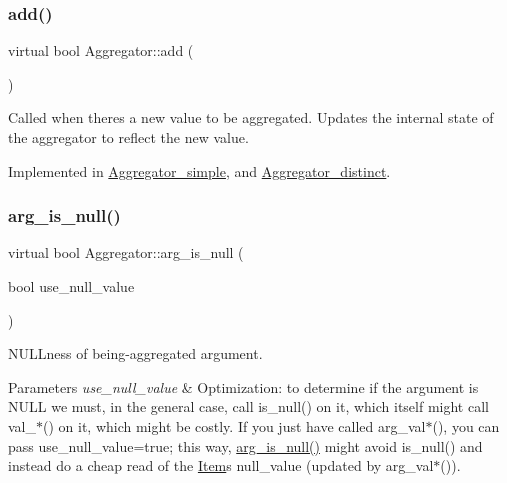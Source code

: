 \subsubsection{\texorpdfstring{add()}{add()}}
{\footnotesize\ttfamily virtual bool Aggregator\+::add (\begin{DoxyParamCaption}{ }\end{DoxyParamCaption})\hspace{0.3cm}{\ttfamily [pure virtual]}}

Called when there\textquotesingle{}s a new value to be aggregated. Updates the internal state of the aggregator to reflect the new value. 

Implemented in \mbox{\hyperlink{classAggregator__simple_aa3b0160d86a60634bd390596bd524c7a}{Aggregator\+\_\+simple}}, and \mbox{\hyperlink{classAggregator__distinct_af72d7cc1082245015c41e99893992a4f}{Aggregator\+\_\+distinct}}.

\mbox{\label{classAggregator_a2581c04dee61cf1a4d72519da64baf53}} 
\subsubsection{\texorpdfstring{arg\+\_\+is\+\_\+null()}{arg\_is\_null()}}
{\footnotesize\ttfamily virtual bool Aggregator\+::arg\+\_\+is\+\_\+null (\begin{DoxyParamCaption}\item[{bool}]{use\+\_\+null\+\_\+value }\end{DoxyParamCaption})\hspace{0.3cm}{\ttfamily [pure virtual]}}

N\+U\+L\+Lness of being-\/aggregated argument.


\begin{DoxyParams}{Parameters}
{\em use\+\_\+null\+\_\+value} & Optimization\+: to determine if the argument is N\+U\+LL we must, in the general case, call is\+\_\+null() on it, which itself might call val\+\_\+$\ast$() on it, which might be costly. If you just have called arg\+\_\+val$\ast$(), you can pass use\+\_\+null\+\_\+value=true; this way, \mbox{\hyperlink{classAggregator_a2581c04dee61cf1a4d72519da64baf53}{arg\+\_\+is\+\_\+null()}} might avoid is\+\_\+null() and instead do a cheap read of the \mbox{\hyperlink{classItem}{Item}}\textquotesingle{}s null\+\_\+value (updated by arg\+\_\+val$\ast$()). \\
\hline
\end{DoxyParams}


